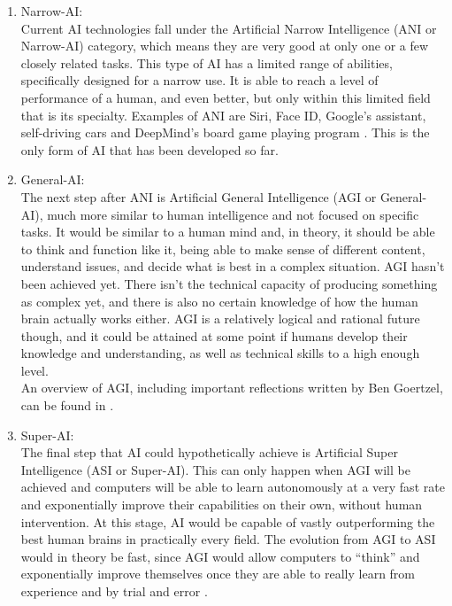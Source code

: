 \begin{enumerate}
\item Narrow-AI: \\
Current AI technologies fall under the Artificial Narrow Intelligence (ANI or Narrow-AI) category, which means they are very good at only one or a few closely related tasks. This type of AI has a limited range of abilities, specifically designed for a narrow use. It is able to reach a level of performance of a human, and even better, but only within this limited field that is its specialty. Examples of ANI are Siri, Face ID, Google's assistant, self-driving cars and DeepMind's board game playing program \cite{bhatia_2021}. This is the only form of AI that has been developed so far.

\item General-AI: \\
The next step after ANI is Artificial General Intelligence (AGI or General-AI), much more similar to human intelligence and not focused on specific tasks. It would be similar to a human mind and, in theory, it should be able to think and function like it, being able to make sense of different content, understand issues, and decide what is best in a complex situation. 
AGI hasn’t been achieved yet. There isn't the technical capacity of producing something as complex yet, and there is also no certain knowledge of how the human brain actually works either. 
AGI is a relatively logical and rational future though, and it could be attained at some point if humans develop their knowledge and understanding, as well as technical skills to a high enough level. \\
An overview of AGI, including important reflections written by Ben Goertzel, can be found in \cite{goertzel_AGI}.

\item Super-AI: \\
The final step that AI could hypothetically achieve is Artificial Super Intelligence (ASI or Super-AI). This can only happen when AGI will be achieved and computers will be able to learn autonomously at a very fast rate and exponentially improve their capabilities on their own, without human intervention. At this stage, AI would be capable of vastly outperforming the best human brains in practically every field. The evolution from AGI to ASI would in theory be fast, since AGI would allow computers to “think” and exponentially improve themselves once they are able to really learn from experience and by trial and error \cite{dambrot2019symbiotic}.
\end{enumerate}

